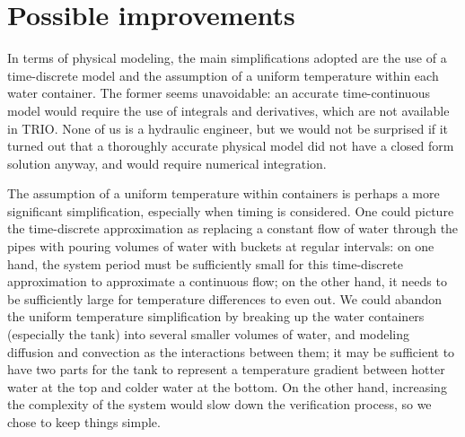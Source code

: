\documentclass[a4paper,12pt]{article}
\begin{document}
\section{Possible improvements}

In terms of physical modeling, the main simplifications adopted are the use of a time-discrete model and the assumption of a uniform temperature within each water container. The former seems unavoidable: an accurate time-continuous model would require the use of integrals and derivatives, which are not available in TRIO. None of us is a hydraulic engineer, but we would not be surprised if it turned out that a thoroughly accurate physical model did not have a closed form solution anyway, and would require numerical integration.

The assumption of a uniform temperature within containers is perhaps a more significant simplification, especially when timing is considered. One could picture the time-discrete approximation as replacing a constant flow of water through the pipes with pouring volumes of water with buckets at regular intervals: on one hand, the system period must be sufficiently small for this time-discrete approximation to approximate a continuous flow; on the other hand, it needs to be sufficiently large for temperature differences to even out. We could abandon the uniform temperature simplification by breaking up the water containers (especially the tank) into several smaller volumes of water, and modeling diffusion and convection as the interactions between them; it may be sufficient to have two parts for the tank to represent a temperature gradient between hotter water at the top and colder water at the bottom. On the other hand, increasing the complexity of the system would slow down the verification process, so we chose to keep things simple.
\end{document}
